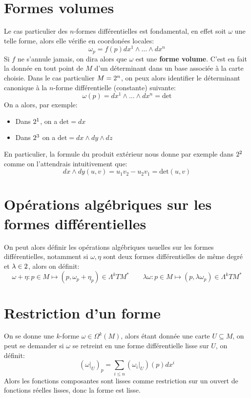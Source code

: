    \section{Formes volumes}
      Le cas particulier des \(n\)-formes différentielles est fondamental, en effet soit \( \omega \) une telle forme, alors elle vérifie en coordonées locales:
      \[ 
         \omega_p =  f(p)dx^1 \wedge \ldots \wedge dx^n
      \]
      Si \( f \) ne s'annule jamais, on dira alors que \( \omega \) est une \textbf{forme volume}. C'est en fait la donnée en tout point de \(M\) d'un déterminant dans un base associée à la carte choisie. Dans le cas particulier \( M = 2^n \), on peux alors identifier le déterminant canonique à la \( n \)-forme différentielle (constante) suivante:
      \[ 
         \omega(p) = dx^1 \wedge \ldots \wedge dx^n = \text{det}
      \]
      On a alors, par exemple:
      \begin{itemize}
         \item Dans \(2^1\), on a \(\text{det} = dx\)
         \item Dans \(2^3\) on a \(\text{det} = dx \wedge dy \wedge dz\)
      \end{itemize}
      En particulier, la formule du produit extérieur nous donne par exemple dans \(2^2\) comme on l'attendrais intuitivement que:
      \[ 
         dx \wedge dy(u, v) = u_1v_2 - u_2v_1 = \text{det}(u, v)
      \]
   \section{Opérations algébriques sur les formes différentielles}
      On peut alors définir les opérations algébriques usuelles sur les formes différentielles, notamment si \( \omega, \eta \) sont deux formes différentielles de même degré et \( \lambda \in 2 \), alors on définit:
      \[ 
         \omega + \eta : p \in M \longmapsto (p, \omega_p + \eta_p) \in \Lambda^kTM^* \quad\quad \lambda \omega: p \in M \longmapsto (p, \lambda \omega_p) \in \Lambda^kTM^*
      \] 
   \section{Restriction d'un forme}
      On se donne une \(k\)-forme \( \omega \in \Omega^k(M) \), alors étant donnée une carte \( U \subseteq M \), on peut se demander si \( \omega \) se retreint en une forme différentielle lisse sur \( U \), on définit:
      \[ 
         (\omega|_U)_p = \sum_{i \leq n} (\omega_i|_U)(p)dx^i 
      \]
      Alors les fonctions composantes sont lisses comme restriction sur un ouvert de fonctions réelles lisses, donc la forme est lisse.   
